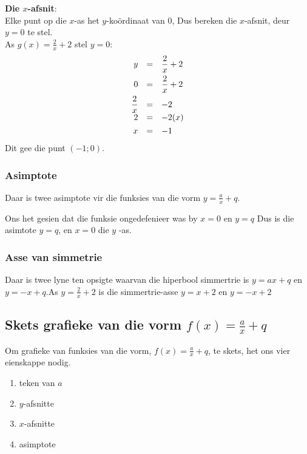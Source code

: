 \textbf{Die $x$-afsnit}: \\
Elke punt op die $x$-as het $y$-ko\"ordinaat van $0$, Dus bereken die $x$-afsnit, deur $y=0$ te stel.\\
As $g(x)=\frac{2}{x}+2$ stel $y=0$:
\begin{equation*}
\begin{array}{ccl}
\hfill y& =& \dfrac{2}{x}+2\hfill \vspace{4pt}\\
 \hfill 0& =& \dfrac{2}{x}+2\hfill \vspace{4pt} \\
 \hfill \dfrac{2}{x}& =& -2\hfill \\
 \hfill 2& =& -2(x)\hfill \vspace{4pt}\\
 \hfill x& =& -1\hfill 
\end{array}
\end{equation*}
Dit gee die punt  $(-1; 0)$.


\subsubsection*{Asimptote}

Daar is twee asimptote vir die funksies van die vorm $y=\frac{a}{x}+q$. \par 
Ons het gesien dat die funksie ongedefenieer was by $x=0$ en $y=q$ Dus is die asimtote $y=q$, en $x=0$ die $y$ -as. 

\subsubsection*{Asse van simmetrie}
Daar is twee lyne ten opsigte waarvan die hiperbool simmertrie is $y=ax+q$ en $y = -x +q$.As $y = \frac{2}{x} + 2$ is die simmertrie-asse $y = x + 2$ en $y = -x + 2$


\subsection*{Skets grafieke van die vorm  $f(x)=\frac{a}{x}+q$}

Om grafieke van funksies van die vorm, $f(x)=\frac{a}{x}+q$, te skets, het ons vier eienskappe nodig.
\begin{enumerate}[noitemsep, label=\textbf{\arabic*}. ] 
\item teken van $a$
\item $y$-afsnitte
\item $x$-afsnitte
\item asimptote
\end{enumerate}

